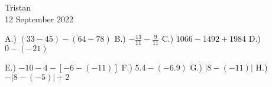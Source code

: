 \documentclass[14pt]{extarticle}
\begin{document}
\null\hfill
Tristan\\
\null\hfill
12 September 2022

\vspace{10mm}
A.)  \begin{math}
(33-45)-(64-78)
\end{math}
\vfill
B.)  \begin{math}
-\frac{13}{11} - \frac{9}{11}
\end{math}
\vfill
C.)  \begin{math}
1066-1492+1984
\end{math}
\vfill
D.)  \begin{math}
0-(-21)
\end{math}
\clearpage

E.)  \begin{math}
-10-4-[-6-(-11)]
\end{math}
\vfill
F.)  \begin{math}
5.4-(-6.9)
\end{math}
\vfill
G.)  \begin{math}
|8-(-11)|
\end{math}
\vfill
H.)  \begin{math}
-|8-(-5)|+2
\end{math}
\end{document}
